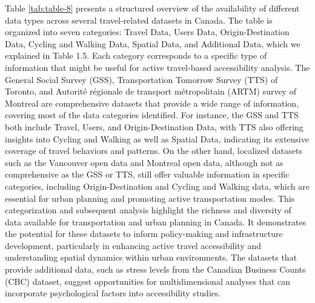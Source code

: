 \documentclass[12pt,twoside]{reedthesis}
\begin{document}
Table \ref{tab:table-8} presents a structured overview of the availability of different data types across several travel-related datasets in Canada. The table is organized into seven categories: Travel Data, Users Data, Origin-Destination Data, Cycling and Walking Data, Spatial Data, and Additional Data, which we explained in Table 1.5. Each category corresponds to a specific type of information that might be useful for active travel-based accessibility analysis.
The General Social Survey (GSS), Transportation Tomorrow Survey (TTS) of Toronto, and Autorité régionale de transport métropolitain (ARTM) survey of Montreal are comprehensive datasets that provide a wide range of information, covering most of the data categories identified. For instance, the GSS and TTS both include Travel, Users, and Origin-Destination Data, with TTS also offering insights into Cycling and Walking as well as Spatial Data, indicating its extensive coverage of travel behaviors and patterns.
On the other hand, localized datasets such as the Vancouver open data and Montreal open data, although not as comprehensive as the GSS or TTS, still offer valuable information in specific categories, including Origin-Destination and Cycling and Walking data, which are essential for urban planning and promoting active transportation modes.
This categorization and subsequent analysis highlight the richness and diversity of data available for transportation and urban planning in Canada. It demonstrates the potential for these datasets to inform policy-making and infrastructure development, particularly in enhancing active travel accessibility and understanding spatial dynamics within urban environments. The datasets that provide additional data, such as stress levels from the Canadian Business Counts (CBC) dataset, suggest opportunities for multidimensional analyses that can incorporate psychological factors into accessibility studies.
\end{document}
